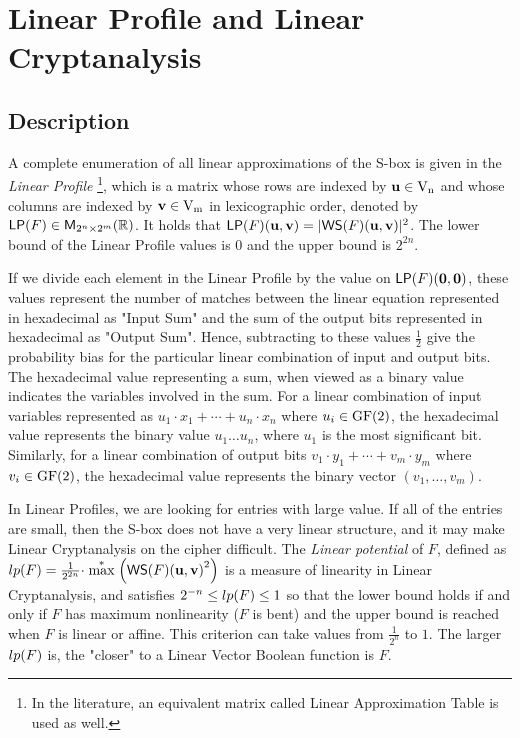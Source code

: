 \section{Linear Profile and Linear Cryptanalysis}
\label{sec:LP}

\subsection{Description}

A complete enumeration of all linear approximations of the S-box is given in the \textit{Linear Profile} \footnote{In the literature, an equivalent matrix called Linear Approximation Table is used as well.}, which is a matrix whose rows are indexed by $\vec{u} \in \gf{V_n}$ and whose columns are indexed by $\vec{v} \in \gf{V_m}$ in lexicographic order, denoted by $\matr{LP}(F) \in \matr{M}_{2^n \times 2^m}(\bbbr)$. It holds that $\matr{LP}(F)(\vec{u},\vec{v}) =|\matr{WS}(F)(\vec{u},\vec{v})|^2$. The lower bound of the Linear Profile values is $0$ and the upper bound is $2^{2n}$.

If we divide each element in the Linear Profile by the value on $\matr{LP}(F)(\vec{0},\vec{0})$, these values represent the number of matches between the linear equation represented in hexadecimal as "Input Sum" and the sum of the output bits represented in hexadecimal as "Output Sum". Hence, subtracting to these values $\frac{1}{2}$ give the probability bias for the particular linear combination of input and output bits. The hexadecimal value representing a sum, when viewed as a binary value indicates the variables involved in the sum. For a linear combination of input variables represented as $u_1 \cdot x_1+ \cdots +u_n \cdot x_n$ where $u_i \in \gf{GF(2)}$, the hexadecimal value represents the binary value $u_1 \ldots u_n$, where $u_1$ is the most significant bit. Similarly, for a linear combination of output bits $v_1 \cdot y_1+ \cdots +v_m \cdot y_m$ where $v_i \in \gf{GF(2)}$, the hexadecimal value represents the binary vector $(v_1, \ldots ,v_m)$. 

In Linear Profiles, we are looking for entries with large value. If all of the entries are small, then the S-box does not have a very linear structure, and it may make Linear Cryptanalysis on the cipher difficult. The \textit{Linear potential} of $F$, defined as $\crit{lp}(F) = \frac{1}{2^{2n}} \cdot \stackrel{*}{\max} \left( {\matr{WS}(F)(\vec{u},\vec{v})}^2 \right)$ is a measure of linearity in Linear Cryptanalysis, and satisfies \cite{ChabaudV:94} $2^{-n} \leq \crit{lp}(F) \leq 1$ so that the lower bound holds if and only if $F$ has maximum nonlinearity ($F$ is bent) and the upper bound is reached when $F$ is linear or affine. This criterion can take values from $\frac{1}{2^n}$ to $1$. The larger $\crit{lp}(F)$ is, the "closer" to a Linear Vector Boolean function is $F$. 

